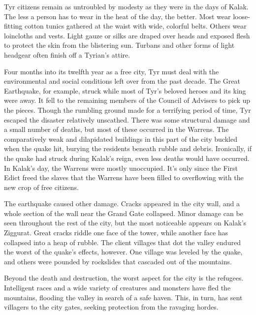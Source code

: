 {	Tyr citizens remain as untroubled by modesty as they were in the days of Kalak. The less a person has to wear in the heat of the day, the better. Most wear loose-fitting cotton tunics gathered at the waist with wide, colorful belts. Others wear loincloths and vests. Light gauze or silks are draped over heads and exposed flesh to protect the skin from the blistering sun. Turbans and other forms of light headgear often finish off a Tyrian's attire.
}
{
	Four months into its twelfth year as a free city, Tyr must deal with the environmental and social conditions left over from the past decade. The Great Earthquake, for example, struck while most of Tyr's beloved heroes and its king were away. It fell to the remaining members of the Council of Advisers to pick up the pieces. Though the rumbling ground made for a terrifying period of time, Tyr escaped the disaster relatively unscathed. There was some structural damage and a small number of deaths, but most of these occurred in the Warrens. The comparatively weak and dilapidated buildings in this part of the city buckled when the quake hit, burying the residents beneath rubble and debris. Ironically, if the quake had struck during Kalak's reign, even less deaths would have occurred. In Kalak's day, the Warrens were mostly unoccupied. It's only since the First Edict freed the slaves that the Warrens have been filled to overflowing with the new crop of free citizens.

	The earthquake caused other damage. Cracks appeared in the city wall, and a whole section of the wall near the Grand Gate collapsed. Minor damage can be seen throughout the rest of the city, but the most noticeable appears on Kalak's Ziggurat. Great cracks riddle one face of the tower, while another face has collapsed into a heap of rubble. The client villages that dot the valley endured the worst of the quake's effects, however. One village was leveled by the quake, and others were pounded by rockslides that cascaded out of the mountains.

	Beyond the death and destruction, the worst aspect for the city is the refugees. Intelligent races and a wide variety of creatures and monsters have fled the mountains, flooding the valley in search of a safe haven. This, in turn, has sent villagers to the city gates, seeking protection from the ravaging hordes.

}
